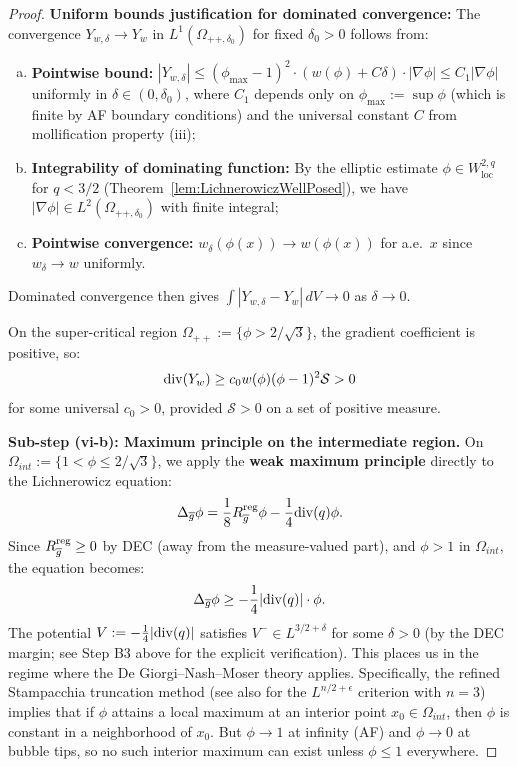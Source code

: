 \begin{proof}
\textbf{Uniform bounds justification for dominated convergence:} The convergence $Y_{w,\delta} \to Y_w$ in $L^1(\Omega_{++,\delta_0})$ for fixed $\delta_0 > 0$ follows from:
\begin{enumerate}[(a)]
    \item \textbf{Pointwise bound:} $|Y_{w,\delta}| \le (\phi_{\max} - 1)^2 \cdot (w(\phi) + C\delta) \cdot |\nabla\phi| \le C_1 |\nabla\phi|$ uniformly in $\delta \in (0, \delta_0)$, where $C_1$ depends only on $\phi_{\max} := \sup \phi$ (which is finite by AF boundary conditions) and the universal constant $C$ from mollification property (iii);
    \item \textbf{Integrability of dominating function:} By the elliptic estimate $\phi \in W^{2,q}_{\mathrm{loc}}$ for $q < 3/2$ (Theorem~\ref{lem:LichnerowiczWellPosed}), we have $|\nabla\phi| \in L^2(\Omega_{++,\delta_0})$ with finite integral;
    \item \textbf{Pointwise convergence:} $w_\delta(\phi(x)) \to w(\phi(x))$ for a.e.\ $x$ since $w_\delta \to w$ uniformly.
\end{enumerate}
Dominated convergence then gives $\int |Y_{w,\delta} - Y_w| \, dV \to 0$ as $\delta \to 0$.

On the super-critical region $\Omega_{++} := \{\phi > 2/\sqrt{3}\}$, the gradient coefficient is positive, so:
\begin{equation}
    \mathrm{div}(Y_w) \ge c_0 w(\phi) (\phi-1)^2 \mathcal{S} > 0
\end{equation}
for some universal $c_0 > 0$, provided $\mathcal{S} > 0$ on a set of positive measure.

\textbf{Sub-step (vi-b): Maximum principle on the intermediate region.}
On $\Omega_{int} := \{1 < \phi \le 2/\sqrt{3}\}$, we apply the \textbf{weak maximum principle} directly to the Lichnerowicz equation:
\begin{equation}
    \Delta_{\overline{g}}\phi = \frac{1}{8}R_{\overline{g}}^{\mathrm{reg}}\phi - \frac{1}{4}\mathrm{div}(q)\phi.
\end{equation}
Since $R_{\overline{g}}^{\mathrm{reg}} \ge 0$ by DEC (away from the measure-valued part), and $\phi > 1$ in $\Omega_{int}$, the equation becomes:
\begin{equation}
    \Delta_{\overline{g}}\phi \ge -\frac{1}{4}|\mathrm{div}(q)| \cdot \phi.
\end{equation}
The potential $V := -\frac{1}{4}|\mathrm{div}(q)|$ satisfies $V^- \in L^{3/2+\delta}$ for some $\delta > 0$ (by the DEC margin; see Step B3 above for the explicit verification). This places us in the regime where the De Giorgi--Nash--Moser theory applies. Specifically, the refined Stampacchia truncation method \cite{stampacchia1966} (see also \cite[Theorem 8.22]{gilbarg2001} for the $L^{n/2+\epsilon}$ criterion with $n=3$) implies that if $\phi$ attains a local maximum at an interior point $x_0 \in \Omega_{int}$, then $\phi$ is constant in a neighborhood of $x_0$. But $\phi \to 1$ at infinity (AF) and $\phi \to 0$ at bubble tips, so no such interior maximum can exist unless $\phi \le 1$ everywhere.


\end{proof}
